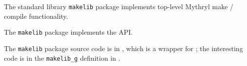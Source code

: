 
The standard library {\tt makelib} package implements top-level Mythryl make / compile functionality.

The {\tt makelib} package implements the  API.

The {\tt makelib} package source code is in , 
which is a wrapper for ;  the 
interesting code is in the {\tt makelib\_g} definition in  
.



